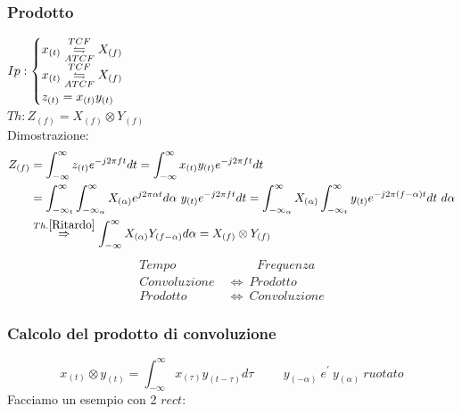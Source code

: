         \subsubsection{Prodotto}\label{Prodotto}
            $Ip:\begin{cases}
                x_{(t)}\overunderset{TCF}{ATCF}{\leftrightharpoons} X_{(f)} \\
                x_{(t)}\overunderset{TCF}{ATCF}{\leftrightharpoons} X_{(f)} \\
                z_{(t)} = x_{(t)}y_{(t)}   
            \end{cases}$\\
            $Th: Z_{(f)} = X_{(f)}\otimes Y_{(f)} $ \\
            Dimostrazione:
                \begin{align}
                    Z_{(f)} &= \int_{-\infty}^{\infty} z_{(t)} e^{-j2\pi ft} dt = \int_{-\infty}^{\infty}x_{(t)}y_{(t)} e^{-j2\pi ft} dt \nonumber \\
                            &= \int_{-\infty_{t}}^{\infty} \int_{-\infty_{\alpha}}^{\infty}X_{(\alpha)}e^{j2\pi \alpha t} d\alpha\ y_{(t)}e^{-j2\pi ft} dt =\int_{-\infty_{\alpha}}^{\infty}X_{(\alpha)} \int_{-\infty_{t}}^{\infty}y_{(t)}e^{-j2\pi (f-\alpha)t} dt\ d\alpha\nonumber \\
                            &\overset{Th. \ref{Ritardo}}{\Rightarrow} \int_{-\infty}^{\infty}X_{(\alpha)}Y_{(f-\alpha)}  d\alpha = X_{(f)}\otimes Y_{(f)} \nonumber 
                \end{align}
            \begin{align}
                Tempo&\hspace{1cm} Frequenza \nonumber \\ 
                Convoluzione\ &\Longleftrightarrow \ Prodotto \nonumber \\ 
                Prodotto\ &\Longleftrightarrow \ Convoluzione \nonumber 
            \end{align}
        \subsubsection{Calcolo del prodotto di convoluzione}\label{Calcolo del prodotto di convoluzione}
        \[
            x_{(t)} \otimes  y_{(t)} = \int_{-\infty}^{\infty} x_{(\tau)}y_{(t-\tau)} d\tau \hspace{1cm} y_{(-\alpha)}\ e^\prime\ y_{(\alpha)}\ ruotato 
        \]
        Facciamo un esempio con 2 $rect$:\\


